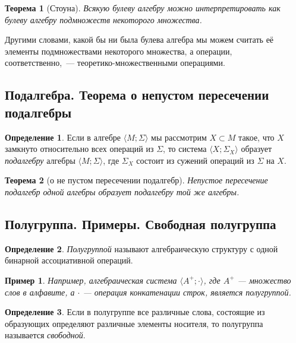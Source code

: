 \documentclass{article}
\newtheorem*{theorem*}{Теорема}
\theoremstyle{plain}
\newtheorem*{example*}{Пример}
\theoremstyle{definition}
\newtheorem{definition}{Определение}[subsection]
\begin{document}
\begin{theorem*}[Стоуна]
	Всякую булеву алгебру можно интерпретировать как булеву алгебру подмножеств некоторого множества.
\end{theorem*}

Другими словами, какой бы ни была булева алгебра мы можем считать её элементы подмножествами некоторого множества, а операции, соответственно,~--- теоретико-множественными операциями.

\subsection{Подалгебра. Теорема о непустом пересечении подалгебры}

\begin{definition}
	Если в алгебре \(\langle M; \Sigma \rangle\) мы рассмотрим \(X \subset M\) такое, что \(X\) замкнуто относительно всех операций из \(\Sigma\), то система \(\langle X; \Sigma_X \rangle\) образует \textit{подалгебру} алгебры \(\langle M; \Sigma \rangle\), где \(\Sigma_X\) состоит из сужений операций из \(\Sigma\) на \(X\).
\end{definition}

\begin{theorem*}[о не пустом пересечении подалгебр]
	Непустое пересечение подалгебр одной алгебры образует подалгебру той же алгебры.
\end{theorem*}

\subsection{Полугруппа. Примеры. Свободная полугруппа}

\begin{definition}
	\textit{Полугруппой} называют алгебраическую структуру с одной бинарной ассоциативной операций.
\end{definition}

\begin{example*}
	Например, алгебраическая система \(\langle A^+; \cdot \rangle\), где \(A^+\) — множество слов в алфавите, а \(\cdot\) — операция конкатенации строк, является полугруппой.
\end{example*}

\begin{definition}
	Если в полугруппе все различные слова, состоящие из образующих определяют различные элементы носителя, то полугруппа называется \textit{свободной}.
\end{definition}
\end{document}
